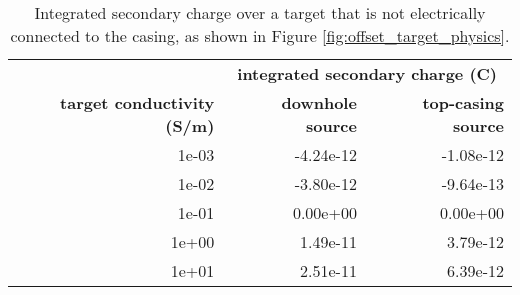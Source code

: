 \begin{table}
\centering
    \caption{Integrated secondary charge over a target that is not electrically connected to the casing, as shown in Figure \ref{fig:offset_target_physics}.}
    \begin{tabular}[htb]{| r | r | r |}
        \hline
                                           & \multicolumn{2}{|c|}{\textbf{integrated secondary charge (C)}} \\
        \textbf{target conductivity (S/m)} & \textbf{downhole source} & \textbf{top-casing source} \\
        \hline
        1e-03 & -4.24e-12 & -1.08e-12 \\
        1e-02 & -3.80e-12 & -9.64e-13 \\
        1e-01 & 0.00e+00 & 0.00e+00 \\
        1e+00 & 1.49e-11 & 3.79e-12 \\
        1e+01 & 2.51e-11 & 6.39e-12 \\
        \hline
    \end{tabular}
    \label{tab:offset_charge}
 \end{table}


